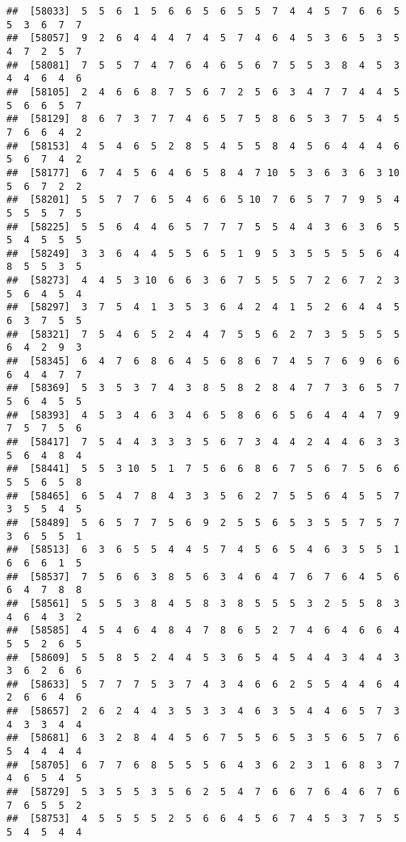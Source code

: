 \documentclass[
]{book}
\begin{document}
\begin{verbatim}
##  [58033]  5  5  6  1  5  6  6  5  6  5  5  7  4  4  5  7  6  6  5  5  3  6  7  7
##  [58057]  9  2  6  4  4  4  7  4  5  7  4  6  4  5  3  6  5  3  5  4  7  2  5  7
##  [58081]  7  5  5  7  4  7  6  4  6  5  6  7  5  5  3  8  4  5  3  4  4  6  4  6
##  [58105]  2  4  6  6  8  7  5  6  7  2  5  6  3  4  7  7  4  4  5  5  6  6  5  7
##  [58129]  8  6  7  3  7  7  4  6  5  7  5  8  6  5  3  7  5  4  5  7  6  6  4  2
##  [58153]  4  5  4  6  5  2  8  5  4  5  5  8  4  5  6  4  4  4  6  5  6  7  4  2
##  [58177]  6  7  4  5  6  4  6  5  8  4  7 10  5  3  6  3  6  3 10  5  6  7  2  2
##  [58201]  5  5  7  7  6  5  4  6  6  5 10  7  6  5  7  7  9  5  4  5  5  5  7  5
##  [58225]  5  5  6  4  4  6  5  7  7  7  5  5  4  4  3  6  3  6  5  5  4  5  5  5
##  [58249]  3  3  6  4  4  5  5  6  5  1  9  5  3  5  5  5  5  6  4  8  5  5  3  5
##  [58273]  4  4  5  3 10  6  6  3  6  7  5  5  5  7  2  6  7  2  3  5  6  4  5  4
##  [58297]  3  7  5  4  1  3  5  3  6  4  2  4  1  5  2  6  4  4  5  6  3  7  5  5
##  [58321]  7  5  4  6  5  2  4  4  7  5  5  6  2  7  3  5  5  5  5  6  4  2  9  3
##  [58345]  6  4  7  6  8  6  4  5  6  8  6  7  4  5  7  6  9  6  6  6  4  4  7  7
##  [58369]  5  3  5  3  7  4  3  8  5  8  2  8  4  7  7  3  6  5  7  5  6  4  5  5
##  [58393]  4  5  3  4  6  3  4  6  5  8  6  6  5  6  4  4  4  7  9  7  5  7  5  6
##  [58417]  7  5  4  4  3  3  3  5  6  7  3  4  4  2  4  4  6  3  3  5  6  4  8  4
##  [58441]  5  5  3 10  5  1  7  5  6  6  8  6  7  5  6  7  5  6  6  5  5  6  5  8
##  [58465]  6  5  4  7  8  4  3  3  5  6  2  7  5  5  6  4  5  5  7  3  5  5  4  5
##  [58489]  5  6  5  7  7  5  6  9  2  5  5  6  5  3  5  5  7  5  7  3  6  5  5  1
##  [58513]  6  3  6  5  5  4  4  5  7  4  5  6  5  4  6  3  5  5  1  6  6  6  1  5
##  [58537]  7  5  6  6  3  8  5  6  3  4  6  4  7  6  7  6  4  5  6  6  4  7  8  8
##  [58561]  5  5  5  3  8  4  5  8  3  8  5  5  5  3  2  5  5  8  3  4  6  4  3  2
##  [58585]  4  5  4  6  4  8  4  7  8  6  5  2  7  4  6  4  6  6  4  5  5  2  6  5
##  [58609]  5  5  8  5  2  4  4  5  3  6  5  4  5  4  4  3  4  4  3  3  6  2  6  6
##  [58633]  5  7  7  7  5  3  7  4  3  4  6  6  2  5  5  4  4  6  4  2  6  6  4  6
##  [58657]  2  6  2  4  4  3  5  3  3  4  6  3  5  4  4  6  5  7  3  4  3  3  4  4
##  [58681]  6  3  2  8  4  4  5  6  7  5  5  6  5  3  5  6  5  7  6  5  4  4  4  4
##  [58705]  6  7  7  6  8  5  5  5  6  4  3  6  2  3  1  6  8  3  7  4  6  5  4  5
##  [58729]  5  3  5  5  3  5  6  2  5  4  7  6  6  7  6  4  6  7  6  7  6  5  5  2
##  [58753]  4  5  5  5  5  2  5  6  6  4  5  6  7  4  5  3  7  5  5  5  4  5  4  4

\end{verbatim}
\end{document}
